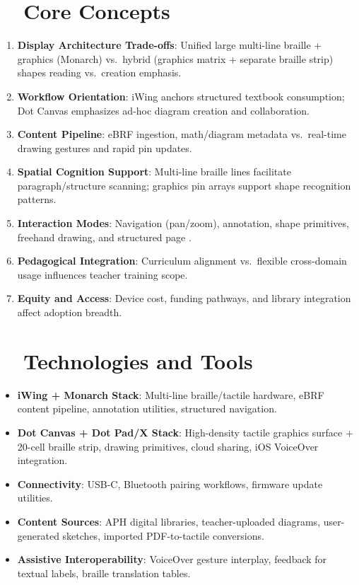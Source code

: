 \section{~~Core Concepts}
\label{sec:sr29-core-concepts}
\begin{enumerate}
	\item \textbf{Display Architecture Trade-offs}: Unified large multi-line braille + graphics (Monarch) vs.\ hybrid (graphics matrix + separate braille strip) shapes reading vs.\ creation emphasis.
	\item \textbf{Workflow Orientation}: iWing anchors structured textbook consumption; Dot Canvas emphasizes ad-hoc diagram creation and collaboration.
	\item \textbf{Content Pipeline}: eBRF ingestion, math/diagram metadata vs.\ real-time drawing gestures and rapid pin updates.
	\item \textbf{Spatial Cognition Support}: Multi-line braille lines facilitate paragraph/structure scanning; graphics pin arrays support shape recognition patterns.
	\item \textbf{Interaction Modes}: Navigation (pan/zoom), annotation, shape primitives, freehand drawing, and structured page .
	\item \textbf{Pedagogical Integration}: Curriculum alignment vs.\ flexible cross-domain usage influences teacher training scope.
	\item \textbf{Equity and Access}: Device cost, funding pathways, and library integration affect adoption breadth.
\end{enumerate}

\section{~~Technologies and Tools}
\label{sec:sr29-technologies}
\begin{itemize}
	\item \textbf{iWing + Monarch Stack}: Multi-line braille/tactile hardware, eBRF content pipeline, annotation utilities, structured navigation\supercite{paths_monarch, nelowvision_monarch}.
	\item \textbf{Dot Canvas + Dot Pad/X Stack}: High-density tactile graphics surface + 20-cell braille strip, drawing primitives, cloud sharing, iOS VoiceOver integration\supercite{dot_appstore, visionaid_dotpad}.
	\item \textbf{Connectivity}: USB-C, Bluetooth pairing workflows, firmware update utilities.
	\item \textbf{Content Sources}: APH digital libraries, teacher-uploaded diagrams, user-generated sketches, imported PDF-to-tactile conversions\supercite{ces_dotcanvas}.
	\item \textbf{Assistive Interoperability}: VoiceOver gesture interplay,  feedback for textual labels, braille translation tables.
\end{itemize}

